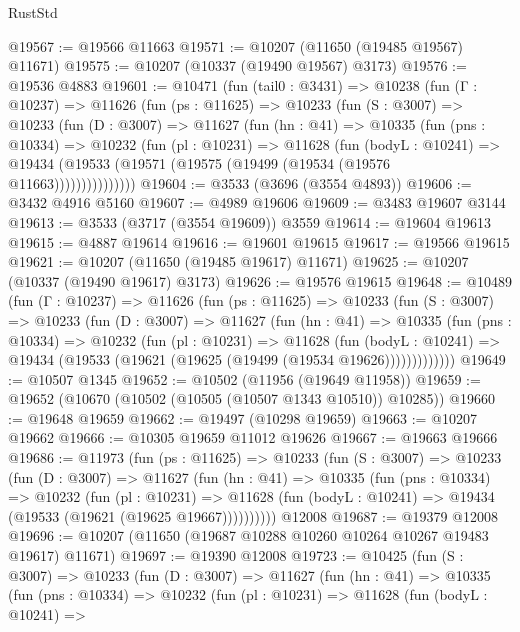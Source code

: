 \begin{lexlean}{RustStd}
\begin{coremodule}
@19567 := @19566 @11663
@19571 := @10207 (@11650 (@19485 @19567) @11671)
@19575 := @10207 (@10337 (@19490 @19567) @3173)
@19576 := @19536 @4883
@19601 := @10471
    (fun (tail0 : @3431) =>
    @10238
      (fun (Γ : @10237) =>
      @11626
        (fun (ps : @11625) =>
        @10233
          (fun (S : @3007) =>
          @10233
            (fun (D : @3007) =>
            @11627
              (fun (hn : @41) =>
              @10335
                (fun (pns : @10334) =>
                @10232
                  (fun (pl : @10231) =>
                  @11628
                    (fun (bodyL : @10241) =>
                    @19434 (@19533 (@19571 (@19575 (@19499 (@19534 (@19576 @11663)))))))))))))))
@19604 := @3533 (@3696 (@3554 @4893))
@19606 := @3432 @4916 @5160
@19607 := @4989 @19606
@19609 := @3483 @19607 @3144
@19613 := @3533 (@3717 (@3554 @19609)) @3559
@19614 := @19604 @19613
@19615 := @4887 @19614
@19616 := @19601 @19615
@19617 := @19566 @19615
@19621 := @10207 (@11650 (@19485 @19617) @11671)
@19625 := @10207 (@10337 (@19490 @19617) @3173)
@19626 := @19576 @19615
@19648 := @10489
    (fun (Γ : @10237) =>
    @11626
      (fun (ps : @11625) =>
      @10233
        (fun (S : @3007) =>
        @10233
          (fun (D : @3007) =>
          @11627
            (fun (hn : @41) =>
            @10335
              (fun (pns : @10334) =>
              @10232
                (fun (pl : @10231) =>
                @11628
                  (fun (bodyL : @10241) =>
                  @19434 (@19533 (@19621 (@19625 (@19499 (@19534 @19626)))))))))))))
@19649 := @10507 @1345
@19652 := @10502 (@11956 (@19649 @11958))
@19659 := @19652 (@10670 (@10502 (@10505 (@10507 @1343 @10510)) @10285))
@19660 := @19648 @19659
@19662 := @19497 (@10298 @19659)
@19663 := @10207 @19662
@19666 := @10305 @19659 @11012 @19626
@19667 := @19663 @19666
@19686 := @11973
    (fun (ps : @11625) =>
    @10233
      (fun (S : @3007) =>
      @10233
        (fun (D : @3007) =>
        @11627
          (fun (hn : @41) =>
          @10335
            (fun (pns : @10334) =>
            @10232
              (fun (pl : @10231) =>
              @11628 (fun (bodyL : @10241) => @19434 (@19533 (@19621 (@19625 @19667))))))))))
    @12008
@19687 := @19379 @12008
@19696 := @10207 (@11650 (@19687 @10288 @10260 @10264 @10267 @19483 @19617) @11671)
@19697 := @19390 @12008
@19723 := @10425
    (fun (S : @3007) =>
    @10233
      (fun (D : @3007) =>
      @11627
        (fun (hn : @41) =>
        @10335
          (fun (pns : @10334) =>
          @10232
            (fun (pl : @10231) =>
            @11628
              (fun (bodyL : @10241) =>

\end{coremodule}
\end{lexlean}
